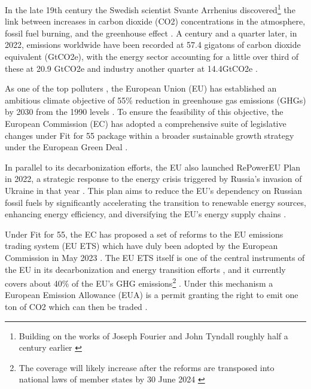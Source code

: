 \documentclass[preprint, 3p,
authoryear]{elsarticle} %
\begin{document}
In the late 19th century the Swedish scientist Svante Arrhenius
discovered\footnote{Building on the works of Joseph Fourier and John Tyndall roughly half a century earlier \citep{corfee-morlot_global_2007}}
the link between increases in carbon dioxide (CO2) concentrations in the
atmosphere, fossil fuel burning, and the greenhouse effect
\citep{corfee-morlot_global_2007, hart_scientific_1993, weart_discovery_2008}.
A century and a quarter later, in 2022, emissions worldwide have been
recorded at 57.4 gigatons of carbon dioxide equivalent (GtCO2e), with
the energy sector accounting for a little over third of these at 20.9
GtCO2e and industry another quarter at 14.4GtCO2e
\citep{unep_emissions_2023}.

As one of the top polluters \citep{unep_emissions_2023}, the European
Union (EU) has established an ambitious climate objective of 55\%
reduction in greenhouse gas emissions (GHGs) by 2030 from the 1990
levels \citep[Art 4(1)]{regulation_2021_1119}. To ensure the feasibility
of this objective, the European Commission (EC) has adopted a
comprehensive suite of legislative changes under Fit for 55 package
within a broader sustainable growth strategy under the European Green
Deal \citep{delivering_2021}.

In parallel to its decarbonization efforts, the EU also launched
RePowerEU Plan in 2022, a strategic response to the energy crisis
triggered by Russia's invasion of Ukraine in that year
\citep{communication_2022}. This plan aims to reduce the EU's dependency
on Russian fossil fuels by significantly accelerating the transition to
renewable energy sources, enhancing energy efficiency, and diversifying
the EU's energy supply chains \citep[1-5]{communication_2022}.

Under Fit for 55, the EC has proposed a set of reforms to the EU
emissions trading system (EU ETS) which have duly been adopted by the
European Commission in May 2023 \citep{directive_2023_959}. The EU ETS
itself is one of the central instruments of the EU in its
decarbonization and energy transition efforts
\citep{decision_2015_1814, bai_drivers_2023}, and it currently covers
about 40\% of the EU's GHG
emissions\footnote{The coverage will likely increase after the reforms are transposed into national laws of member states by 30 June 2024 \citep{directive_2023_959}}
\citep{eu_ets}. Under this mechanism a European Emission Allowance (EUA)
is a permit granting the right to emit one ton of CO2 which can then be
traded \citep{directive_2003_87}.
\end{document}

